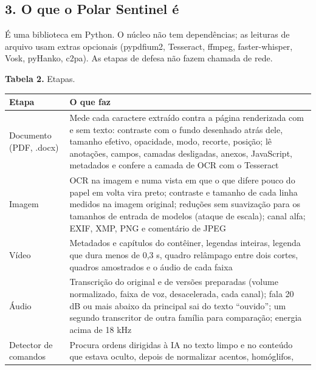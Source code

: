 \documentclass[
  brazilian,
  11pt,
]{article}
\newcounter{none} %
\begin{document}
\subsection{3. O que o Polar Sentinel
é}\label{o-que-o-polar-sentinel-uxe9}

É uma biblioteca em Python. O núcleo não tem dependências; as leituras
de arquivo usam extras opcionais (pypdfium2, Tesseract, ffmpeg,
faster-whisper, Vosk, pyHanko, c2pa). As etapas de defesa não fazem
chamada de rede.

\textbf{Tabela 2.} Etapas.

{\def\LTcaptype{none} %
\begin{longtable}[]{@{}
  >{\raggedright\arraybackslash}p{}
  >{\raggedright\arraybackslash}p{}@{}}
\toprule\noalign{}
\begin{minipage}[b]{\linewidth}\raggedright
Etapa
\end{minipage} & \begin{minipage}[b]{\linewidth}\raggedright
O que faz
\end{minipage} \\
\midrule\noalign{}
\endhead
\bottomrule\noalign{}
\endlastfoot
Documento (PDF, .docx) & Mede cada caractere extraído contra a página
renderizada com e sem texto: contraste com o fundo desenhado atrás dele,
tamanho efetivo, opacidade, modo, recorte, posição; lê anotações,
campos, camadas desligadas, anexos, JavaScript, metadados e confere a
camada de OCR com o Tesseract \\
Imagem & OCR na imagem e numa vista em que o que difere pouco do papel
em volta vira preto; contraste e tamanho de cada linha medidos na imagem
original; reduções sem suavização para os tamanhos de entrada de modelos
(ataque de escala); canal alfa; EXIF, XMP, PNG e comentário de JPEG \\
Vídeo & Metadados e capítulos do contêiner, legendas inteiras, legenda
que dura menos de 0,3 s, quadro relâmpago entre dois cortes, quadros
amostrados e o áudio de cada faixa \\
Áudio & Transcrição do original e de versões preparadas (volume
normalizado, faixa de voz, desacelerada, cada canal); fala 20 dB ou mais
abaixo da principal sai do texto ``ouvido''; um segundo transcritor de
outra família para comparação; energia acima de 18 kHz \\
Detector de comandos & Procura ordens dirigidas à IA no texto limpo e no
conteúdo que estava oculto, depois de normalizar acentos, homóglifos,

\end{longtable}}
\end{document}

